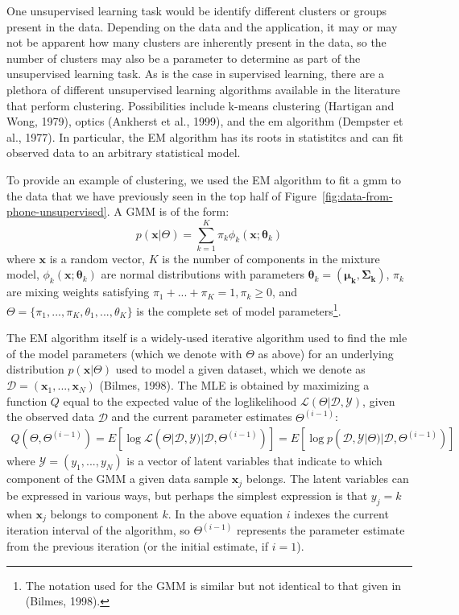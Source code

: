 One unsupervised learning task would be identify different clusters or groups present in the data. Depending on the data and the application, it may or may not be apparent how many clusters are inherently present in the data, so the number of clusters may also be a parameter to determine as part of the unsupervised learning task. As is the case in supervised learning, there are a plethora of different unsupervised learning algorithms available in the literature that perform clustering. Possibilities include k-means clustering (Hartigan and Wong, 1979), \acrshort{optics} (Ankherst et al., 1999), and the \gls{em} algorithm (Dempster et al., 1977). In particular, the EM algorithm has its roots in statistitcs and can fit observed data to an arbitrary statistical model.

To provide an example of clustering, we used the EM algorithm to fit a \gls{gmm} to the data that we have previously seen in the top half of Figure~\ref{fig:data-from-phone-unsupervised}. A GMM is of the form:
%
\begin{equation}
 p(\mathbf{x}|\Theta) = \sum\limits_{k=1}^K \pi_k \phi_k(\mathbf{x}; \boldsymbol{\theta}_k)
\end{equation}
%
where $\mathbf{x}$ is a random vector, $K$ is the number of components in the mixture model, $\phi_k(\mathbf{x}; \boldsymbol{\theta}_k)$ are normal distributions with parameters $\boldsymbol{\theta}_k = (\boldsymbol{\mu_k}, \mathbf{\Sigma_k})$, $\pi_k$ are mixing weights satisfying $\pi_1 + ... + \pi_K = 1, \pi_k \geq 0$, and $\Theta = \{\pi_1,...,\pi_K,\theta_1, ..., \theta_K\}$ is the complete set of model parameters\footnote{The notation used for the GMM is similar but not identical to that given in (Bilmes, 1998).}.

The EM algorithm itself is a widely-used iterative algorithm used to find the \gls{mle} of the model parameters (which we denote with $\Theta$ as above) for an underlying distribution $p(\mathbf{x}|\Theta)$ used to model a given dataset, which we denote as $\mathcal{D} = (\mathbf{x}_1,..., \mathbf{x}_N)$ (Bilmes, 1998). The MLE is obtained by maximizing a function $Q$ equal to the expected value of the loglikelihood $\mathcal{L}(\Theta|\mathcal{D},\mathcal{Y})$, given the observed data $\mathcal{D}$ and the current parameter estimates $\Theta^{(i-1)}$:
%
\begin{gather}
  Q(\Theta,\Theta^{(i-1)}) = E[\log \mathcal{L}(\Theta|\mathcal{D}, \mathcal{Y})|\mathcal{D},\Theta^{(i-1)})]
     = E[\log p(\mathcal{D}, \mathcal{Y}|\Theta)|\mathcal{D},\Theta^{(i-1)})]
\end{gather}
%
where $\mathcal{Y} = (y_1, ..., y_N)$ is a vector of latent variables that indicate to which component of the GMM a given data sample $\mathbf{x}_j$ belongs. The latent variables can be expressed in various ways, but perhaps the simplest expression is that $y_j = k$ when $\mathbf{x}_j$ belongs to component $k$. In the above equation $i$ indexes the current iteration interval of the algorithm, so $\Theta^{(i-1)}$ represents the parameter estimate from the previous iteration (or the initial estimate, if $i=1$).

